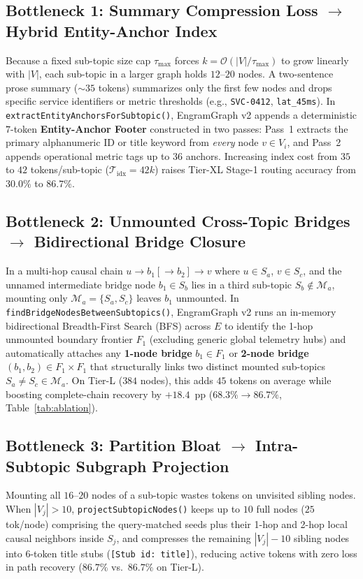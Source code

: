 \documentclass[10pt]{article}
\begin{document}
\subsection{Bottleneck 1: Summary Compression Loss $\rightarrow$ Hybrid Entity-Anchor Index}
Because a fixed sub-topic size cap $\tau_{\max}$ forces $k = \mathcal{O}(|V|/\tau_{\max})$ to grow linearly with $|V|$, each sub-topic in a larger graph holds $12$--$20$ nodes. A two-sentence prose summary ($\sim 35$ tokens) summarizes only the first few nodes and drops specific service identifiers or metric thresholds (e.g., \texttt{SVC-0412}, \texttt{lat\_45ms}). In \texttt{extractEntityAnchorsForSubtopic()}, EngramGraph v2 appends a deterministic $7$-token \textbf{Entity-Anchor Footer} constructed in two passes: Pass~1 extracts the primary alphanumeric ID or title keyword from \emph{every} node $v \in V_i$, and Pass~2 appends operational metric tags up to $36$ anchors. Increasing index cost from $35$ to $42$ tokens/sub-topic ($\mathcal{T}_{\mathrm{idx}} = 42k$) raises Tier-XL Stage-1 routing accuracy from $30.0\%$ to $86.7\%$.

\subsection{Bottleneck 2: Unmounted Cross-Topic Bridges $\rightarrow$ Bidirectional Bridge Closure}
In a multi-hop causal chain $u \to b_1 [\to b_2] \to v$ where $u \in S_a$, $v \in S_c$, and the unnamed intermediate bridge node $b_1 \in S_b$ lies in a third sub-topic $S_b \notin \mathcal{M}_a$, mounting only $\mathcal{M}_a = \{S_a, S_c\}$ leaves $b_1$ unmounted. In \texttt{findBridgeNodesBetweenSubtopics()}, EngramGraph v2 runs an in-memory bidirectional Breadth-First Search (BFS) across $E$ to identify the 1-hop unmounted boundary frontier $F_1$ (excluding generic global telemetry hubs) and automatically attaches any \textbf{1-node bridge} $b_1 \in F_1$ or \textbf{2-node bridge} $(b_1, b_2) \in F_1 \times F_1$ that structurally links two distinct mounted sub-topics $S_a \neq S_c \in \mathcal{M}_a$. On Tier-L ($384$ nodes), this adds $45$ tokens on average while boosting complete-chain recovery by $+18.4$~pp ($68.3\% \to 86.7\%$, Table~\ref{tab:ablation}).

\subsection{Bottleneck 3: Partition Bloat $\rightarrow$ Intra-Subtopic Subgraph Projection}
Mounting all $16$--$20$ nodes of a sub-topic wastes tokens on unvisited sibling nodes. When $|V_j| > 10$, \texttt{projectSubtopicNodes()} keeps up to $10$ full nodes ($25$ tok/node) comprising the query-matched seeds plus their 1-hop and 2-hop local causal neighbors inside $S_j$, and compresses the remaining $|V_j|-10$ sibling nodes into $6$-token title stubs (\texttt{[Stub id: title]}), reducing active tokens with zero loss in path recovery ($86.7\%$ vs.\ $86.7\%$ on Tier-L).
\end{document}
